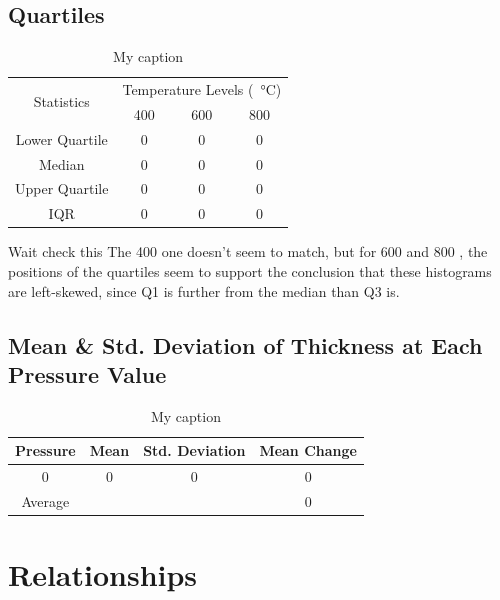\documentclass[letterpaper]{article}
\begin{document}
\subsection{Quartiles}

\begin{table}[H]
 \centering
 \begin{tabular}{c|c|c|c|}
  \multirow{2}{*}{Statistics} & \multicolumn{3}{c|}{Temperature Levels (\SI{}{\celsius})}             \\ \cline{2-4}
                              & 400                                                       & 600 & 800 \\ \hline
  Lower Quartile              & 0                                                         & 0   & 0   \\ \hline
  Median                      & 0                                                         & 0   & 0   \\ \hline
  Upper Quartile              & 0                                                         & 0   & 0   \\ \hline
  IQR                         & 0                                                         & 0   & 0   \\ \hline
 \end{tabular}
 \caption{My caption}
 \label{tempquart}
\end{table}

Wait check this
The 400  one doesn’t seem to match, but for 600  and 800 , the positions of the quartiles seem to support the conclusion that these histograms are left-skewed, since Q1 is further from the median than Q3 is.
\subsection{Mean \& Std. Deviation of Thickness at Each Pressure Value}

\begin{table}[H]
 \centering
 \begin{tabular}{c|c|c|c|}
  Pressure & Mean & Std. Deviation & Mean Change \\ \hline
  0        & 0    & 0              & 0           \\ \hline
  Average  &      &                & 0           \\ \hline
 \end{tabular}
 \caption{My caption}
 \label{pressurestat}
\end{table}

\section{Relationships}
\end{document}
